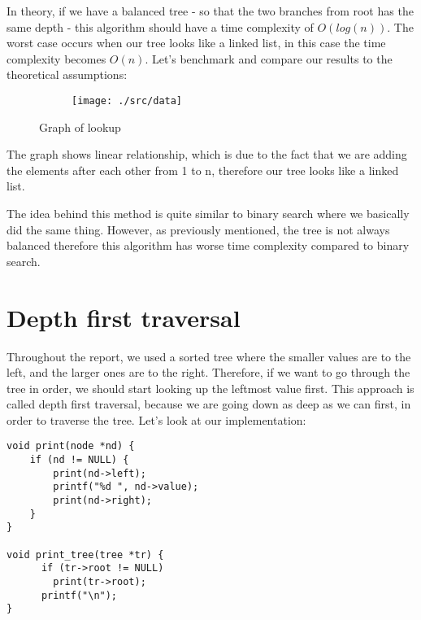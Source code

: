\documentclass[a4paper,11pt]{article}
\begin{document}
    In theory, if we have a balanced tree - so that the two branches from root has the same depth - this algorithm should have a time complexity of $O(log(n))$.
    The worst case occurs when our tree looks like a linked list, in this case the time complexity becomes $O(n)$.
    Let's benchmark and compare our results to the theoretical assumptions:

    \begin{figure}[H]
        \centering
        \begin{subfigure}[b]{.5\textwidth}
            \centering
            \texttt{[image: ./src/data]} %
        \end{subfigure}
        \caption{Graph of lookup}
        \label{fig:graph_1}
    \end{figure}

    The graph shows linear relationship, which is due to the fact that we are adding the elements after each other from 1 to n, therefore our tree looks like a linked list.
    
    The idea behind this method is quite similar to binary search where we basically did the same thing.
    However, as previously mentioned, the tree is not always balanced therefore this algorithm has worse time complexity compared to binary search.

    \section*{Depth first traversal}

    Throughout the report, we used a sorted tree where the smaller values are to the left, and the larger ones are to the right.
    Therefore, if we want to go through the tree in order, we should start looking up the leftmost value first.
    This approach is called depth first traversal, because we are going down as deep as we can first, in order to traverse the tree.
    Let's look at our implementation:
    \begin{verbatim}
void print(node *nd) {
    if (nd != NULL) {
        print(nd->left);
        printf("%d ", nd->value);
        print(nd->right);
    }
}

void print_tree(tree *tr) {
      if (tr->root != NULL)
        print(tr->root);
      printf("\n");
}
    \end{verbatim}
\end{document}
